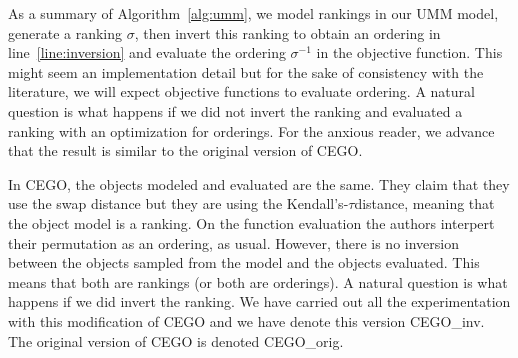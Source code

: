 \documentclass[sigconf,dvipsnames]{acmart}
\newcommand{\ken}{Kendall's-$\tau$}
\begin{document}
As a summary of Algorithm~\ref{alg:umm}, we model rankings in our UMM model, generate a ranking $\sigma$, then invert this ranking to obtain an ordering in line~\ref{line:inversion} and evaluate the ordering $\sigma^{-1}$ in the objective function. This might seem an implementation detail but for the sake of consistency with the literature, we will expect objective functions to evaluate ordering. A natural question is what happens if we did not invert the ranking and evaluated a ranking with an optimization for orderings. For the anxious reader, we advance that the result is similar to the original version of CEGO. 

In CEGO, the objects modeled and evaluated are the same. They claim that they use the swap distance but they are using the \ken  distance, meaning that the object model is a ranking. 
On the function evaluation the authors interpert their permutation as an ordering, as usual. 
However, there is no inversion between the objects sampled from the model and the objects evaluated. 
This means that both are rankings (or both are orderings). A natural question is what happens if we did invert the ranking. We have carried out all the experimentation with this modification of CEGO and we have denote this version CEGO\_inv. The original version of CEGO is denoted CEGO\_orig. 


\end{document}
